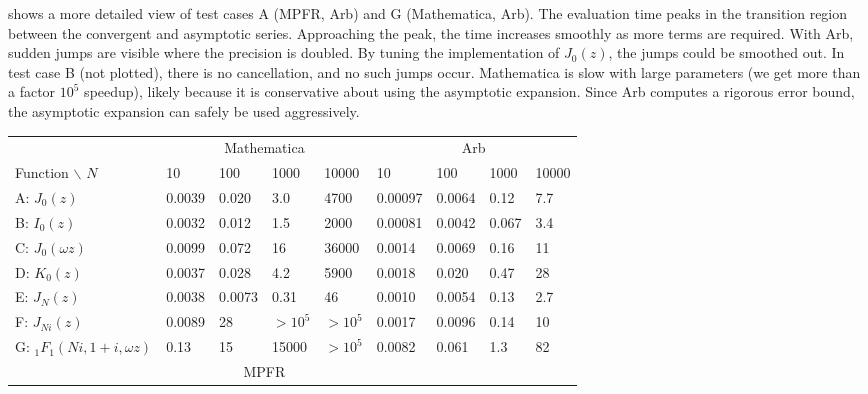 \documentclass[11pt,a4paper]{article}
\begin{document}
 shows a more detailed view of test cases A (MPFR, Arb) and G (Mathematica, Arb).
The evaluation time peaks in the transition region between the convergent and asymptotic series.
Approaching the peak, the time increases smoothly as more terms are required.
With Arb, sudden jumps are visible where the precision is doubled.
By tuning the implementation of $J_0(z)$, the jumps could be smoothed out.
In test case B (not plotted), there is no cancellation, and no such jumps occur.
Mathematica is slow with large parameters (we get more than a factor $10^5$ speedup),
likely because it is conservative about using the asymptotic expansion.
Since Arb computes a rigorous error bound, the asymptotic expansion
can safely be used aggressively.

\begin{table}
\renewcommand{\arraystretch}{1.4}
\setlength{\tabcolsep}{.4em}
\begin{center}
\begin{scriptsize}
\begin{tabular}{l | l l l l | l l l l}
                                  & \multicolumn{4}{|c|}{Mathematica} & \multicolumn{4}{|c}{Arb} \\
Function $\backslash$ $N$         &  10       & 100       & 1000 & 10000 &  10 & 100 & 1000 & 10000  \\ \hline
A: $J_0(z)$              &  0.0039   &  0.020    & 3.0     & 4700      &  0.00097   &  0.0064  &  0.12   &  7.7  \\
B: $I_0(z)$             &   0.0032   &  0.012    & 1.5     & 2000  &  0.00081   &  0.0042  &  0.067  &  3.4  \\
C: $J_0(\omega z)$      &   0.0099   &  0.072    & 16     & 36000      &  0.0014    &  0.0069  &  0.16   &  11   \\
D: $K_0(z)$             &   0.0037   &  0.028    & 4.2     &  5900  &  0.0018    &  0.020   &  0.47   &  28   \\
E: $J_N(z)$            &   0.0038   &  0.0073   & 0.31  &  46  &  0.0010    &  0.0054  &  0.13   &  2.7  \\
F: $J_{Ni}(z)$         &   0.0089   &  28       & $>10^5$     &   $>10^5$  &  0.0017    &  0.0096   &  0.14   &  10   \\
G: ${}_1F_1(Ni,1+i,\omega z)$     &   0.13     &  15       & 15000     &  $>10^5$   &  0.0082    &  0.061   &  1.3    &  82    \\ \hline
           &   \multicolumn{4}{|c|}{MPFR} & \multicolumn{4}{|c}{ } \\ \hline

\end{tabular}
\end{scriptsize}
\end{center}
\end{table}
\end{document}

